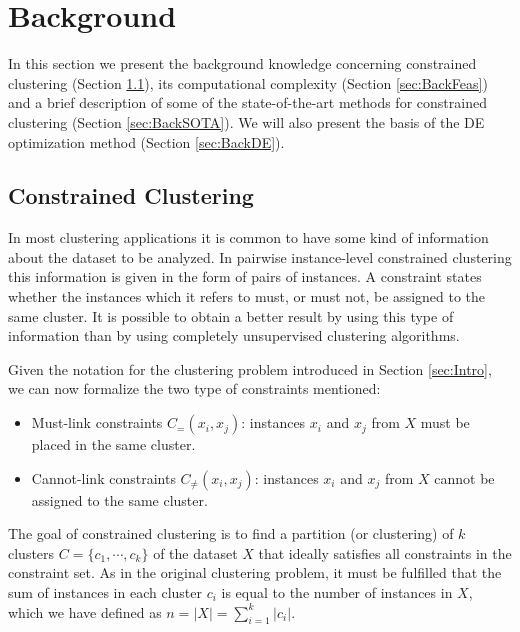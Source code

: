 \documentclass[review]{elsarticle}
\begin{document}
\section{Background} \label{sec:background}

In this section we present the background knowledge concerning constrained clustering (Section \ref{sec:BackCC}), its computational complexity (Section \ref{sec:BackFeas}) and a brief description of some of the state-of-the-art methods for constrained clustering (Section \ref{sec:BackSOTA}). We will also present the basis of the DE optimization method (Section \ref{sec:BackDE}).

\subsection{Constrained Clustering} \label{sec:BackCC}

In most clustering applications it is common to have some kind of information about the dataset to be analyzed. In pairwise instance-level constrained clustering this information is given in the form of pairs of instances. A constraint states whether the instances which it refers to must, or must not, be assigned to the same cluster. It is possible to obtain a better result by using this type of information than by using completely unsupervised clustering algorithms.

Given the notation for the clustering problem introduced in Section \ref{sec:Intro}, we can now formalize the two type of constraints mentioned: 

\begin{itemize}

	\item Must-link constraints $C_=(x_i,x_j)$: instances $x_i$ and $x_j$ from $X$ must be placed in the same cluster.

	\item Cannot-link constraints $C_{\neq}(x_i,x_j)$: instances $x_i$ and $x_j$ from $X$ cannot be assigned to the same cluster.

\end{itemize}

The goal of constrained clustering is to find a partition (or clustering) of $k$ clusters $C = \{c_1, \cdots, c_k\}$ of the dataset $X$ that ideally satisfies all constraints in the constraint set. As in the original clustering problem, it must be fulfilled that the sum of instances in each cluster $c_i$ is equal to the number of instances in $X$, which we have defined as $n = |X| = \sum_{i = 1}^{k} |c_i|$.
\end{document}
